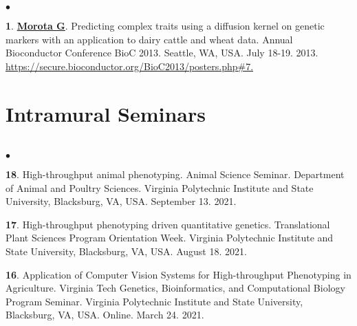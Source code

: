 \documentclass[margin,line,10pt]{res}
\newenvironment{list2}{
  \begin{list}{$\bullet$}{%
      \setlength{\itemsep}{0in}
      \setlength{\parsep}{0in} \setlength{\parskip}{0in}
      \setlength{\topsep}{0in} \setlength{\partopsep}{0in} 
      \setlength{\leftmargin}{0.2in}}}{\end{list}}
\begin{document}
\begin{resume}
\begin{list2}
\vspace{0.5cm}

\item  [{\bf 1}.] \textbf{\underline{Morota G}}. Predicting complex traits using a diffusion kernel on genetic markers with an application to dairy cattle and wheat data. Annual Bioconductor Conference BioC 2013. Seattle, WA, USA. July 18-19. 2013. \textcolor{blue}{\href{https://secure.bioconductor.org/BioC2013/posters.php\#7}{https://secure.bioconductor.org/BioC2013/posters.php\#7. } }  
\end{list2}











\vspace{0.5cm}
\section{\sc Intramural Seminars}
\vspace{1cm}

\section{}
\begin{list2}

  \item  [{\bf 18}.] High-throughput animal phenotyping. Animal Science Seminar. Department of Animal and Poultry Sciences. Virginia Polytechnic Institute and State University, Blacksburg, VA, USA. September 13. 2021. 

    \vspace{0.5cm}


    \item [{\bf 17}.] High-throughput phenotyping driven quantitative genetics. Translational Plant Sciences Program Orientation Week. Virginia Polytechnic Institute and State University, Blacksburg, VA, USA. August 18. 2021.

          \vspace{0.5cm}

\item [{\bf 16}.] Application of Computer Vision Systems for High-throughput Phenotyping in Agriculture. Virginia Tech Genetics, Bioinformatics, and Computational Biology Program Seminar. Virginia Polytechnic Institute and State University, Blacksburg, VA, USA. Online. March 24. 2021.


\end{list2}
\end{resume}
\end{document}
